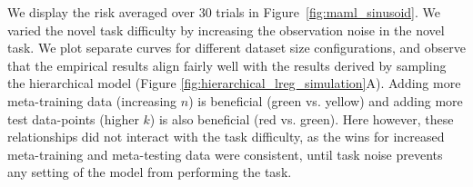 We display the risk averaged over 30 trials in Figure~\ref{fig:maml_sinusoid}. We varied the novel task difficulty by increasing the observation noise in the novel task.
We plot separate curves for different dataset size configurations, and observe that the empirical results align fairly well with the results derived by sampling the hierarchical model (Figure \ref{fig:hierarchical_lreg_simulation}A). Adding more meta-training data (increasing $n$) is beneficial (green vs. yellow)
and adding more test data-points (higher $k$) is also beneficial (red vs. green).  Here however, these relationships did not interact with the task difficulty, as the wins for increased meta-training and meta-testing data were consistent, until task noise prevents any setting of the model from performing the task.
